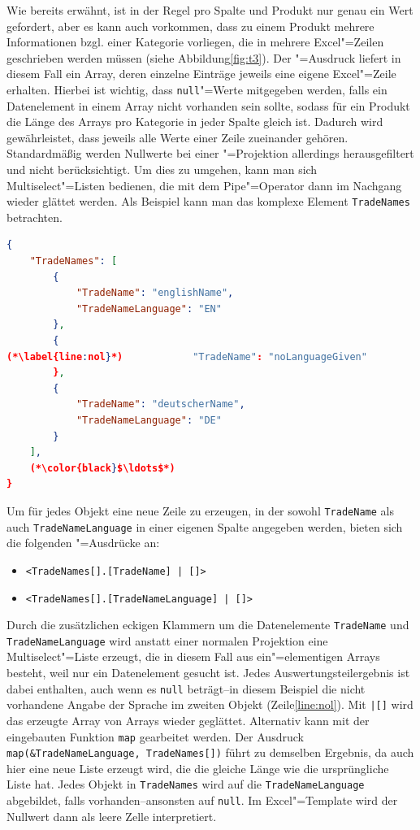Wie bereits erwähnt, ist in der Regel pro Spalte und Produkt nur genau ein Wert gefordert, aber es kann auch vorkommen, dass zu einem Produkt mehrere Informationen bzgl. einer Kategorie vorliegen, die in mehrere Excel"=Zeilen geschrieben werden müssen (siehe Abbildung\nbs\ref{fig:t3}). Der "=Ausdruck liefert in diesem Fall ein Array, deren einzelne Einträge jeweils eine eigene Excel"=Zeile erhalten. Hierbei ist wichtig, dass \texttt{null}"=Werte mitgegeben werden, falls ein Datenelement in einem Array nicht vorhanden sein sollte, sodass für ein Produkt die Länge des Arrays pro Kategorie in jeder Spalte gleich ist. Dadurch wird gewährleistet, dass jeweils alle Werte einer Zeile zueinander gehören. Standardmäßig werden Nullwerte bei einer "=Projektion allerdings herausgefiltert und nicht berücksichtigt. Um dies zu umgehen, kann man sich Multiselect"=Listen bedienen, die mit dem Pipe"=Operator dann im Nachgang wieder glättet werden. Als Beispiel kann man das komplexe Element \texttt{TradeNames} betrachten.
\begin{lstlisting}[language=json,caption={Beispiel eines komplexen Datenelements},label=code:comp]
{
    "TradeNames": [
        {
            "TradeName": "englishName",
            "TradeNameLanguage": "EN"
        },
        {
(*\label{line:nol}*)            "TradeName": "noLanguageGiven"
        },
        {
            "TradeName": "deutscherName",
            "TradeNameLanguage": "DE"
        }
    ],
    (*\color{black}$\ldots$*)
}
\end{lstlisting}
Um für jedes Objekt eine neue Zeile zu erzeugen, in der sowohl \texttt{TradeName} als auch \texttt{TradeNameLanguage} in einer eigenen Spalte angegeben werden, bieten sich die folgenden "=Ausdrücke an:
\begin{itemize}
\item{\texttt{<TradeNames[].[TradeName] | []>}}
\item{\texttt{<TradeNames[].[TradeNameLanguage] | []>}}
\end{itemize}
Durch die zusätzlichen eckigen Klammern um die Datenelemente \texttt{TradeName} und \texttt{TradeNameLanguage} wird anstatt einer normalen Projektion eine Multiselect"=Liste erzeugt, die in diesem Fall aus ein"=elementigen Arrays besteht, weil nur ein Datenelement gesucht ist. Jedes Auswertungsteilergebnis ist dabei enthalten, auch wenn es \texttt{null} beträgt\nbs --\nbs in diesem Beispiel die nicht vorhandene Angabe der Sprache im zweiten Objekt (Zeile\nbs\ref{line:nol}). Mit \texttt{|[]} wird das erzeugte Array von Arrays wieder geglättet. Alternativ kann mit der eingebauten Funktion \texttt{map} gearbeitet werden. Der Ausdruck \texttt{map(\&TradeNameLanguage, TradeNames[])} führt zu demselben Ergebnis, da auch hier eine neue Liste erzeugt wird, die die gleiche Länge wie die ursprüngliche Liste hat. Jedes Objekt in \texttt{TradeNames} wird auf die \texttt{TradeNameLanguage} abgebildet, falls vorhanden\nbs --\nbs ansonsten auf \texttt{null}. Im Excel"=Template wird der Nullwert dann als leere Zelle interpretiert. 

